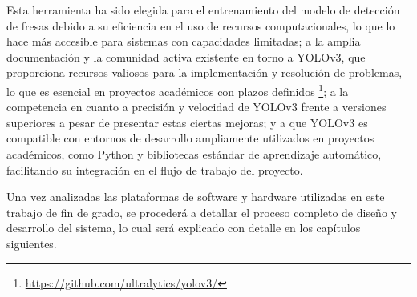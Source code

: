 Esta herramienta ha sido elegida para el entrenamiento del modelo de detección de fresas debido a su eficiencia en el uso de recursos computacionales, lo que lo hace más accesible para sistemas con capacidades limitadas; a la amplia documentación y la comunidad activa existente en torno a YOLOv3, que proporciona recursos valiosos para la implementación y resolución de problemas, lo que es esencial en proyectos académicos con plazos definidos \footnote{\url{https://github.com/ultralytics/yolov3/}}; a la competencia en cuanto a precisión y velocidad de YOLOv3 frente a versiones superiores a pesar de presentar estas ciertas mejoras; y a que YOLOv3 es compatible con entornos de desarrollo ampliamente utilizados en proyectos académicos, como Python y bibliotecas estándar de aprendizaje automático, facilitando su integración en el flujo de trabajo del proyecto.

\vspace{20mm}

Una vez analizadas las plataformas de software y hardware utilizadas en este trabajo de fin de grado, se procederá a detallar el proceso completo de diseño y desarrollo del sistema, lo cual será explicado con detalle en los capítulos siguientes.






